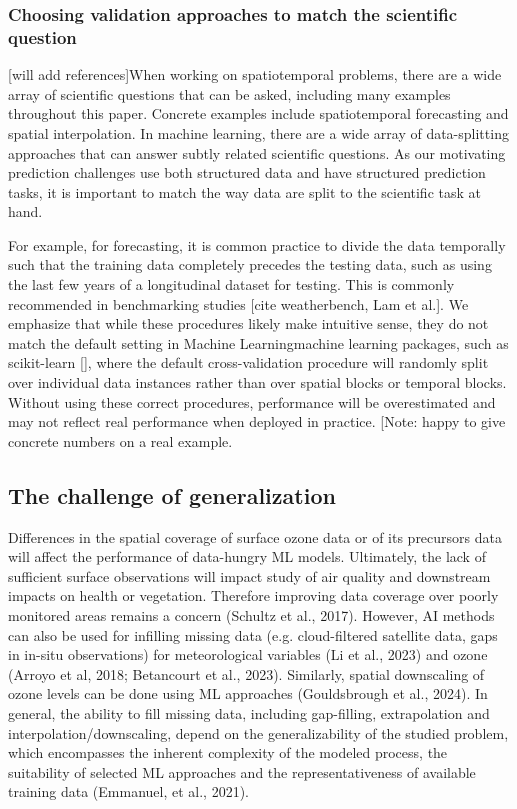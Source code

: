 \documentclass[gmd, manuscript]{copernicus}
\begin{document}
\subsubsection{Choosing validation approaches to match the scientific question}
[will add references]When working on spatiotemporal problems, there are a wide array of scientific questions that can be asked, including many examples throughout this paper. Concrete examples include spatiotemporal forecasting and spatial interpolation. In machine learning, there are a wide array of data-splitting approaches that can answer subtly related scientific questions. As our motivating prediction challenges use both structured data and have structured prediction tasks, it is important to match the way data are split to the scientific task at hand.
 
For example, for forecasting, it is common practice to divide the data temporally such that the training data completely precedes the testing data, such as using the last few years of a longitudinal dataset for testing. This is commonly recommended in benchmarking studies [cite weatherbench, Lam et al.]. 
We emphasize that while these procedures likely make intuitive sense, they do not match the default setting in Machine Learningmachine learning packages, such as scikit-learn [], where the default cross-validation procedure will randomly split over individual data instances rather than over spatial blocks or temporal blocks. Without using these correct procedures, performance will be overestimated and may not reflect real performance when deployed in practice. [Note: happy to give concrete numbers on a real example.


\subsection{The challenge of generalization}
Differences in the spatial coverage of surface ozone data or of its precursors data will affect the performance of data-hungry ML models. Ultimately, the lack of sufficient surface observations will impact study of air quality and downstream impacts on health or vegetation. Therefore improving data coverage over poorly monitored areas remains a concern (Schultz et al., 2017). However,  AI methods  can also be used for infilling missing data (e.g. cloud-filtered satellite data, gaps in in-situ observations) for meteorological variables (Li et al., 2023) and ozone (Arroyo et al, 2018; Betancourt et al., 2023). Similarly, spatial downscaling of ozone levels can be done using ML approaches (Gouldsbrough et al., 2024). In general, the ability to fill missing data, including gap-filling, extrapolation and interpolation/downscaling,  depend on the generalizability of the studied problem, which encompasses the inherent complexity of the modeled process, the suitability of selected ML approaches and the representativeness of available training data (Emmanuel, et al., 2021). 
\end{document}
